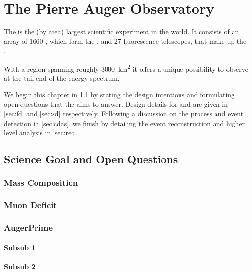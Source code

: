 
\chapter{The Pierre Auger Observatory}
\label{chap:pierre-auger-observatory}

The \PAO is the (by area) largest scientific experiment in the world. It 
consists of an array of 1660 \WCDs, which form the \SD, and 27 fluorescence 
telescopes, that make up the \FD.

With a region spanning roughly \SI{3000}{\kilo\meter\squared} it offers a unique
possibility to observe \UHECRs at the tail-end of the \CR energy spectrum. 

We begin this chapter in \cref{sec:science-case} by stating the design 
intentions and formulating open questions that the \PAO aims to answer. Design
details for \FD and \SD are given in \cref{sec:fd} and \cref{sec:sd} 
respectively. Following a discussion on the \DAQ process and event detection in 
\cref{sec:cdas}, we finish by detailing the event reconstruction and higher 
level analysis in \cref{sec:rec}.


\section{Science Goal and Open Questions}
\label{sec:science-case}

\blindtext

\subsection{Mass Composition}

\blindtext
\subsection{Muon Deficit}

\blindtext
\subsection{AugerPrime}

\blindtext

\subsubsection{Subsub 1}
\blindtext

\subsubsection{Subsub 2}
\blindtext




